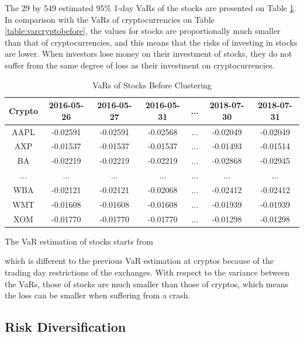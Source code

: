 \documentclass[11pt]{article} %
\theoremstyle{plain}
\theoremstyle{definition}
\begin{document}
The 29 by 549 estimated 95\% 1-day VaRs of the stocks are presented on Table \ref{table:varstockbefore}. In comparison with the VaRs of cryptocurrencies on Table \ref{table:varcryptobefore}, the values for stocks are proportionally much smaller than that of cryptocurrencies, and this means that the risks of investing in stocks are lower. When investors lose money on their investment of stocks, they do not suffer from the same degree of loss as their investment on cryptocurrencies.

{
  \begin{table}[ht]
    \centering
    \small
    \begin{tabular}{|c|c c c c c c|}
        \hline
        Crypto & 2016-05-26 & 2016-05-27 & 2016-05-31 & ... & 2018-07-30 & 2018-07-31 \\ [0.5ex]
        \hline
        AAPL & -0.02591 & -0.02591 & -0.02568 & ... & -0.02049 & -0.02049 \\
        \hline
        AXP & -0.01537 & -0.01537 & -0.01537 & ... & -0.01493 & -0.01514 \\
        \hline
        BA & -0.02219 & -0.02219 & -0.02219 & ... & -0.02868 & -0.02945 \\
        \hline
        ... & ... & ... & ... & ... & ... & ... \\
        \hline
        WBA & -0.02121 & -0.02121 & -0.02068 & ... & -0.02412 & -0.02412 \\
        \hline
        WMT & -0.01608 & -0.01608 & -0.01608 & ... & -0.01939 & -0.01939 \\
        \hline
        XOM & -0.01770 & -0.01770 & -0.01770 & ... & -0.01298 & -0.01298 \\
        \hline
    \end{tabular}
    \caption{VaRs of Stocks Before Clustering}
    \label{table:varstockbefore}
  \end{table}
}

The VaR estimation of stocks starts from \date{26th May 2016} which is different to the previous VaR estimation at cryptos because of the trading day restrictions of the exchanges. With respect to the variance between the VaRs, those of stocks are much smaller than those of cryptos, which means the loss can be smaller when suffering from a crash.

\subsection{Risk Diversification}
\end{document}
